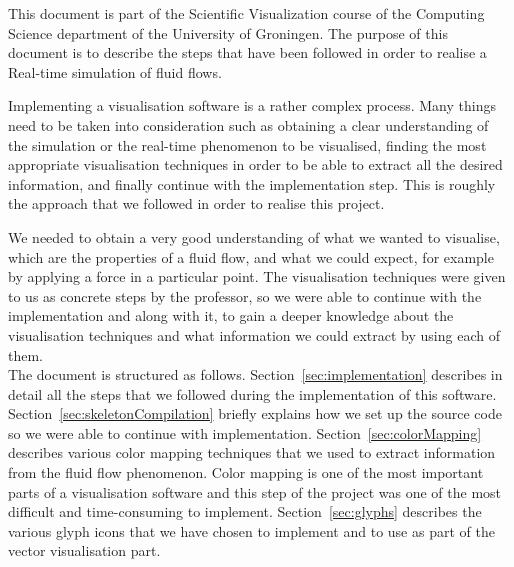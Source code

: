 
This document is part of the Scientific Visualization course of the Computing Science department of the University of Groningen. The purpose of this document is to describe the steps that have been followed in order to realise a Real-time simulation of fluid flows.

Implementing a visualisation software is a rather complex process. Many things need to be taken into consideration such as obtaining a clear understanding of the simulation or the real-time phenomenon to be visualised, finding the most appropriate visualisation techniques in order to be able to extract all the desired information, and finally continue with the implementation step. This is roughly the approach that we followed in order to realise this project.

We needed to obtain a very good understanding of what we wanted to visualise, which are the properties of a fluid flow, and what we could expect, for example by applying a force in a particular point. The visualisation techniques were given to us as concrete steps by the professor, so we were able to continue with the implementation and along with it, to gain a deeper knowledge about the visualisation techniques and what information we could extract by using each of them.\\

The document is structured as follows. Section~\ref{sec:implementation} describes in detail all the steps that we followed during the implementation of this software. Section~\ref{sec:skeletonCompilation} briefly explains how we set up the source code so we were able to continue with implementation. Section~\ref{sec:colorMapping} describes various color mapping techniques that we used to extract information from the fluid flow phenomenon. Color mapping is one of the most important parts of a visualisation software and this step of the project was one of the most difficult and time-consuming to implement. Section~\ref{sec:glyphs} describes the various glyph icons that we have chosen to implement and to use as part of the vector visualisation part.